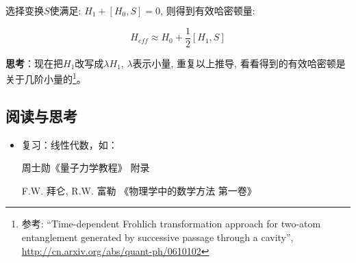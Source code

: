 选择变换$S$使满足: $H_1 + [H_0, S] = 0$, 则得到有效哈密顿量:

\begin{equation*}
 H_{eff} \approx H_0 + \frac{1}{2}[H_1 ,S]
\end{equation*}


\textbf{思考}：现在把$H_1$改写成$\lambda H_1$, $\lambda$表示小量,
重复以上推导, 看看得到的有效哈密顿是关于几阶小量的\footnote{参考:
``Time-dependent Frohlich transformation approach for two-atom
entanglement generated by successive passage through a cavity'',
\url{http://cn.arxiv.org/abs/quant-ph/0610102}}。

\subsection*{阅读与思考}

\begin{itemize}
    \item 复习：线性代数，如：

周士勋《量子力学教程》 附录

F.W. 拜仑, R.W. 富勒 《物理学中的数学方法 第一卷》

   \end{itemize}
